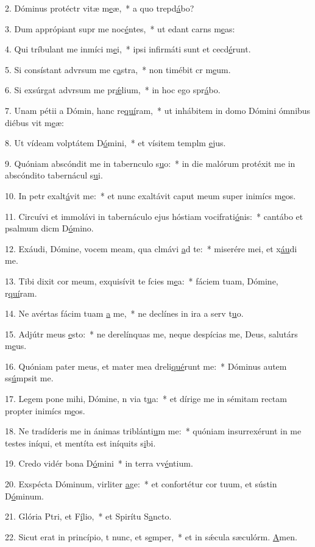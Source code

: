 2. Dóminus protéctr vitæ m\uline{e}æ,~* a quo trepd\uline{á}bo?\par 
3. Dum apprópiant supr me noc\uline{é}ntes,~* ut edant carns m\uline{e}as:\par 
4. Qui tríbulant me inmíci m\uline{e}i,~* ipsi infirmáti sunt et cecd\uline{é}runt.\par 
5. Si consístant advrsum me c\uline{a}stra,~* non timébit cr m\uline{e}um.\par 
6. Si exsúrgat advrsum me pr\uline{ǽ}lium,~* in hoc ego spr\uline{á}bo.\par 
7. Unam pétii a Dómin, hanc re\uline{quí}ram,~* ut inhábitem in domo Dómini ómnibus diébus vit m\uline{e}æ:\par 
8. Ut vídeam volptátem D\uline{ó}mini,~* et vísitem templm \uline{e}jus.\par 
9. Quóniam abscóndit me in tabernculo s\uline{u}o:~* in die malórum protéxit me in abscóndito tabernácul s\uline{u}i.\par 
10. In petr exalt\uline{á}vit me:~* et nunc exaltávit caput meum super inimícs m\uline{e}os.\par 
11. Circuívi et immolávi in tabernáculo ejus hóstiam vocifrati\uline{ó}nis:~* cantábo et psalmum dicm D\uline{ó}mino.\par 
12. Exáudi, Dómine, vocem meam, qua clmávi \uline{a}d te:~* miserére mei, et x\uline{áu}di me.\par 
13. Tibi dixit cor meum, exquisívit te fcies m\uline{e}a:~* fáciem tuam, Dómine, r\uline{quí}ram.\par 
14. Ne avértas fácim tuam \uline{a} me,~* ne declínes in ira a serv t\uline{u}o.\par 
15. Adjútr meus \uline{e}sto:~* ne derelínquas me, neque despícias me, Deus, salutárs m\uline{e}us.\par 
16. Quóniam pater meus, et mater mea dreli\uline{qué}runt me:~* Dóminus autem ss\uline{ú}mpsit me.\par 
17. Legem pone mihi, Dómine, n via t\uline{u}a:~* et dírige me in sémitam rectam propter inimícs m\uline{e}os.\par 
18. Ne tradíderis me in ánimas triblánti\uline{u}m me:~* quóniam insurrexérunt in me testes iníqui, et mentíta est iníquits s\uline{i}bi.\par 
19. Credo vidér bona D\uline{ó}mini~* in terra vv\uline{é}ntium.\par 
20. Exspécta Dóminum, virliter \uline{a}ge:~* et confortétur cor tuum, et sústin D\uline{ó}minum.\par 
21. Glória Ptri, et F\uline{í}lio,~* et Spirítu S\uline{a}ncto.\par 
22. Sicut erat in princípio, t nunc, et s\uline{e}mper,~* et in sǽcula sæculórm. \uline{A}men.\par 
